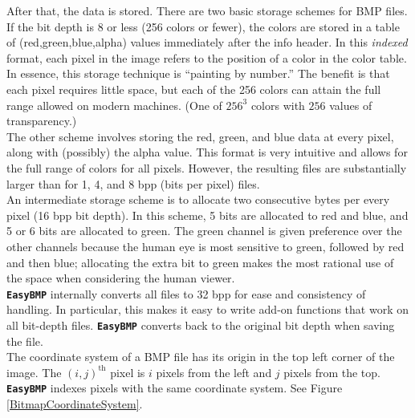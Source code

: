\documentclass[12pt]{article}
\newcommand{\EasyBMP}{\textbf{\texttt{{\color{DarkBlue}Easy}{\color{DarkRed}BMP}}}}
\begin{document}
After that, the data is stored. There are two basic 
storage schemes for BMP files. If the bit depth is 8 or 
less (256 colors or fewer), the colors are stored in a 
table of (red,green,blue,alpha) values immediately after the 
info header. In this \emph{indexed} format, each pixel 
in the image refers to the position of a color in the color 
table. In essence, this storage technique is 
``painting by number.'' The benefit is that each pixel 
requires little space, but each of the 256 colors can 
attain the full range allowed on modern machines. (One of 
$256^3$ colors with $256$ values of transparency.) \\

The other scheme involves storing the red, green, and blue 
data at every pixel, along with (possibly) the alpha value. 
This format is very intuitive and allows for the full 
range of colors for all pixels. However, the resulting files 
are substantially larger than for 1, 4, and 8 bpp (bits per pixel)
files. \\

An intermediate storage scheme is to allocate two consecutive 
bytes per every pixel (16 bpp bit depth). In this scheme, 5 bits are 
allocated to red and blue, and 5 or 6 bits are allocated to green. 
The green channel is given preference over the other channels 
because the human eye is most sensitive to green, followed by 
red and then blue; allocating the extra bit to green makes the 
most rational use of the space when considering the human viewer.\\

\EasyBMP{} internally converts all files to 32 bpp for 
ease and consistency of handling. In particular, this makes it 
easy to write add-on functions that work on all bit-depth files. 
\EasyBMP{} converts back to the original bit depth when saving 
the file. \\

The coordinate system of a BMP file has its origin in the top left corner 
of the image. The $(i,j)^{\textrm{th}}$ pixel is $i$ pixels from the left 
and $j$ pixels from the top. \EasyBMP{} indexes pixels with the 
same coordinate system. See Figure \ref{BitmapCoordinateSystem}. 
\end{document}
